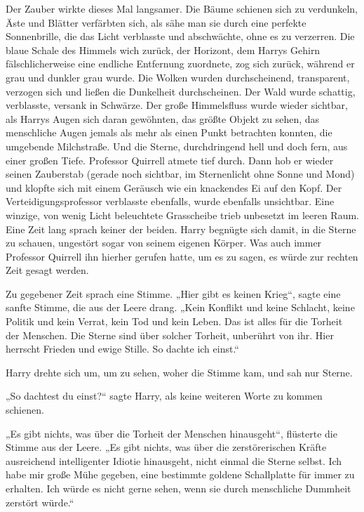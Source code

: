 {Der Zauber wirkte dieses Mal langsamer. Die Bäume schienen sich zu verdunkeln, Äste und Blätter verfärbten sich, als sähe man sie durch eine perfekte Sonnenbrille, die das Licht verblasste und abschwächte, ohne es zu verzerren. Die blaue Schale des Himmels wich zurück, der Horizont, dem Harrys Gehirn fälschlicherweise eine endliche Entfernung zuordnete, zog sich zurück, während er grau und dunkler grau wurde. Die Wolken wurden durchscheinend, transparent, verzogen sich und ließen die Dunkelheit durchscheinen. Der Wald wurde schattig, verblasste, versank in Schwärze. Der große Himmelsfluss wurde wieder sichtbar, als Harrys Augen sich daran gewöhnten, das größte Objekt zu sehen, das menschliche Augen jemals als mehr als einen Punkt betrachten konnten, die umgebende Milchstraße. Und die Sterne, durchdringend hell und doch fern, aus einer großen Tiefe. Professor Quirrell atmete tief durch. Dann hob er wieder seinen Zauberstab (gerade noch sichtbar, im Sternenlicht ohne Sonne und Mond) und klopfte sich mit einem Geräusch wie ein knackendes Ei auf den Kopf. Der Verteidigungsprofessor verblasste ebenfalls, wurde ebenfalls unsichtbar. Eine winzige, von wenig Licht beleuchtete Grasscheibe trieb unbesetzt im leeren Raum. Eine Zeit lang sprach keiner der beiden. Harry begnügte sich damit, in die Sterne zu schauen, ungestört sogar von seinem eigenen Körper. Was auch immer Professor Quirrell ihn hierher gerufen hatte, um es zu sagen, es würde zur rechten Zeit gesagt werden.

Zu gegebener Zeit sprach eine Stimme. „Hier gibt es keinen Krieg“, sagte eine sanfte Stimme, die aus der Leere drang. „Kein Konflikt und keine Schlacht, keine Politik und kein Verrat, kein Tod und kein Leben. Das ist alles für die Torheit der Menschen. Die Sterne sind über solcher Torheit, unberührt von ihr. Hier herrscht Frieden und ewige Stille. So dachte ich einst.“

Harry drehte sich um, um zu sehen, woher die Stimme kam, und sah nur Sterne.

„So dachtest du einst?“ sagte Harry, als keine weiteren Worte zu kommen schienen.

„Es gibt nichts, was über die Torheit der Menschen hinausgeht“, flüsterte die Stimme aus der Leere. „Es gibt nichts, was über die zerstörerischen Kräfte ausreichend intelligenter Idiotie hinausgeht, nicht einmal die Sterne selbst. Ich habe mir große Mühe gegeben, eine bestimmte goldene Schallplatte für immer zu erhalten. Ich würde es nicht gerne sehen, wenn sie durch menschliche Dummheit zerstört würde.“

}
